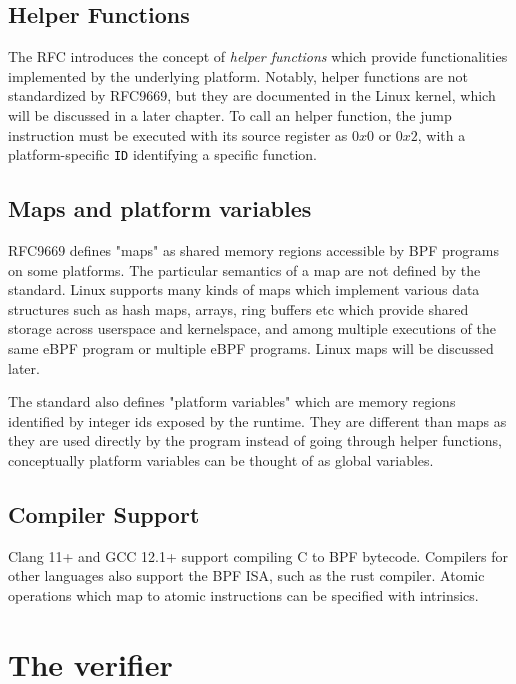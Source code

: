 \subsection{Helper Functions}

The RFC introduces the concept of \textit{helper functions} which provide
functionalities implemented by the underlying platform. Notably, helper
functions are not standardized by RFC9669, but they are documented in the Linux
kernel, which will be discussed in a later chapter. To call an helper function,
the jump instruction must be executed with its source register as $0x0$ or
$0x2$, with a platform-specific \verb|ID| identifying a specific function.

\subsection{Maps and platform variables}

RFC9669 defines "maps" as shared memory regions accessible by BPF programs on
some platforms. The particular semantics of a map are not defined by the
standard. Linux supports many kinds of maps which implement various data
structures such as hash maps, arrays, ring buffers etc which provide shared
storage across userspace and kernelspace, and among multiple executions of the
same eBPF program or multiple eBPF programs. Linux maps will be discussed later.

The standard also defines "platform variables" which are memory regions
identified by integer ids exposed by the runtime. They are different than maps
as they are used directly by the program instead of going through helper
functions, conceptually platform variables can be thought of as global
variables.

\subsection{Compiler Support}

Clang 11+ and GCC 12.1+ support compiling C to BPF bytecode. Compilers for other
languages also support the BPF ISA, such as the rust compiler. Atomic operations
which map to atomic instructions can be specified with intrinsics.

\section{The verifier}


